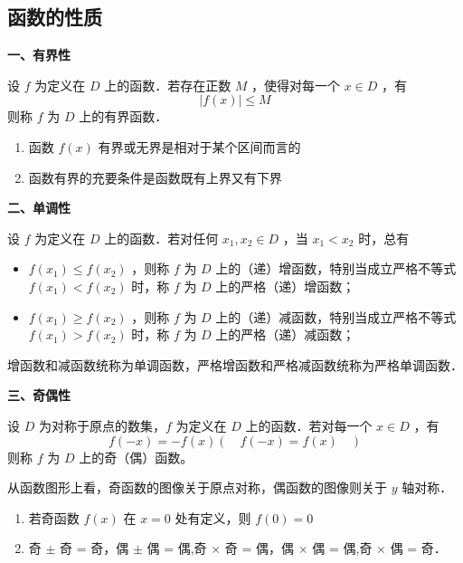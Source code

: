 \newpage


\subsection{函数的性质}
\noindent \textbf{一、有界性}
\begin{definition*}[有界性]
设 $f$ 为定义在 $D$ 上的函数．若存在正数 $M$ ，使得对每一个 $x \in D$ ，有
$$
	|f(x)| \leqslant M
$$
则称 $f$ 为 $D$ 上的有界函数．	
\end{definition*}


\begin{remark}
	\begin{enumerate}
		\item 函数 $f(x)$ 有界或无界是相对于某个区间而言的
		\item 函数有界的充要条件是函数既有上界又有下界\\
	\end{enumerate}
\end{remark}

\noindent \textbf{二、单调性}
\begin{definition*}[单调性]
设 $f$ 为定义在 $D$ 上的函数．若对任何 $x_1, x_2 \in D$ ，当 $x_1<x_2$ 时，总有
\begin{itemize}
	\item[（i）] $f\left(x_1\right) \leqslant f\left(x_2\right)$ ，则称 $f$ 为 $D$ 上的（递）增函数，特别当成立严格不等式 $f\left(x_1\right)< f\left(x_2\right)$ 时，称 $f$ 为 $D$ 上的严格（递）增函数；
	\item[（ii）] $f\left(x_1\right) \geqslant f\left(x_2\right)$ ，则称 $f$ 为 $D$ 上的（递）减函数，特别当成立严格不等式 $f\left(x_1\right)> f\left(x_2\right)$ 时，称 $f$ 为 $D$ 上的严格（递）减函数；
\end{itemize}

增函数和减函数统称为单调函数，严格增函数和严格减函数统称为严格单调函数．	\\
\end{definition*}


\noindent \textbf{三、奇偶性}
\begin{definition*}[奇偶性]
设 $D$ 为对称于原点的数集，$f$ 为定义在 $D$ 上的函数．若对每一个 $x \in D$ ，有
$$
f(-x)=-f(x)(\quad f(-x)=f(x)\quad )
$$
则称 $f$ 为 $D$ 上的奇（偶）函数。

从函数图形上看，奇函数的图像关于原点对称，偶函数的图像则关于 $y$ 轴对称．	
\end{definition*}


\begin{remark}
	\begin{enumerate}
		\item 若奇函数 $f(x)$ 在 $x=0$ 处有定义，则 $f(0)=0$ 
		\item 奇 $\pm$ 奇 = 奇，偶 $\pm$ 偶 = 偶,奇 $\times$ 奇 = 偶，偶 $\times$ 偶 = 偶,奇 $\times$ 偶 = 奇．\\
	\end{enumerate}
\end{remark}

